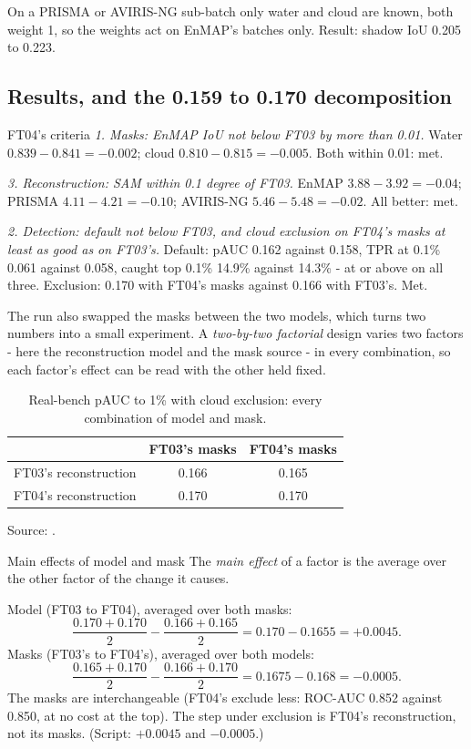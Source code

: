 On a PRISMA or AVIRIS-NG sub-batch only water and cloud are known, both weight 1, so the weights act on EnMAP's batches
only. Result: shadow IoU 0.205 to 0.223.

\subsection{Results, and the 0.159 to 0.170 decomposition}

\begin{worked}[label={we:ftruns:ft04crit}]{FT04's criteria}
\emph{1. Masks: EnMAP IoU not below FT03 by more than 0.01.} Water $0.839 - 0.841 = -0.002$; cloud $0.810 - 0.815 =
-0.005$. Both within 0.01: met.

\emph{3. Reconstruction: SAM within 0.1 degree of FT03.} EnMAP $3.88 - 3.92 = -0.04$; PRISMA $4.11 - 4.21 = -0.10$;
AVIRIS-NG $5.46 - 5.48 = -0.02$. All better: met.

\emph{2. Detection: default not below FT03, and cloud exclusion on FT04's masks at least as good as on FT03's.}
Default: pAUC 0.162 against 0.158, TPR at 0.1\% 0.061 against 0.058, caught top 0.1\% 14.9\% against 14.3\% - at or
above on all three. Exclusion: 0.170 with FT04's masks against 0.166 with FT03's. Met.
\end{worked}

The run also swapped the masks between the two models, which turns two numbers into a small experiment. A
\emph{two-by-two factorial} design varies two factors - here the reconstruction model and the mask source - in every
combination, so each factor's effect can be read with the other held fixed. 

\begin{table}[htbp]
\centering
\caption{Real-bench pAUC to 1\% with cloud exclusion: every combination of model and mask.}
\label{tab:ftruns:swap}
\small
\begin{tabular}{lcc}
\toprule
 & FT03's masks & FT04's masks \\
\midrule
FT03's reconstruction & 0.166 & 0.165 \\
FT04's reconstruction & 0.170 & 0.170 \\
\bottomrule
\end{tabular}

\smallskip
{\footnotesize Source: .}
\end{table}

\begin{worked}[label={we:ftruns:factorial}]{Main effects of model and mask}
The \emph{main effect} of a factor is the average over the other factor of the change it causes.

Model (FT03 to FT04), averaged over both masks:
\[
\frac{0.170 + 0.170}{2} - \frac{0.166 + 0.165}{2} = 0.170 - 0.1655 = +0.0045 .
\]
Masks (FT03's to FT04's), averaged over both models:
\[
\frac{0.165 + 0.170}{2} - \frac{0.166 + 0.170}{2} = 0.1675 - 0.168 = -0.0005 .
\]
The masks are interchangeable (FT04's exclude less: ROC-AUC 0.852 against 0.850, at no cost at the top). The step under
exclusion is FT04's reconstruction, not its masks. (Script: $+0.0045$ and $-0.0005$\tagC.)
\end{worked}

